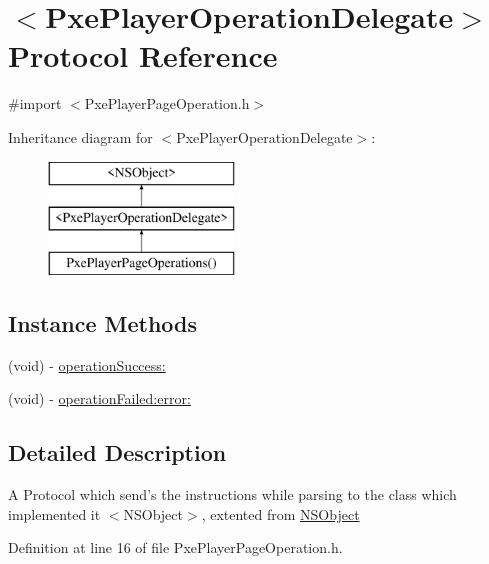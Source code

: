 \hypertarget{protocol_pxe_player_operation_delegate-p}{\section{$<$Pxe\-Player\-Operation\-Delegate$>$ Protocol Reference}
\label{protocol_pxe_player_operation_delegate-p}
}


{\ttfamily \#import $<$Pxe\-Player\-Page\-Operation.\-h$>$}

Inheritance diagram for $<$Pxe\-Player\-Operation\-Delegate$>$\-:\begin{figure}[H]
\begin{center}
\leavevmode
\includegraphics[height=3.000000cm]{protocol_pxe_player_operation_delegate-p}
\end{center}
\end{figure}
\subsection*{Instance Methods}
\begin{DoxyCompactItemize}
\item 
(void) -\/ \hyperlink{protocol_pxe_player_operation_delegate-p_a3b2105606b8df469075d5cfc9931c726}{operation\-Success\-:}
\item 
(void) -\/ \hyperlink{protocol_pxe_player_operation_delegate-p_aa51ed881ea55a516cfc01025a564ccd5}{operation\-Failed\-:error\-:}
\end{DoxyCompactItemize}


\subsection{Detailed Description}
A Protocol which send's the instructions while parsing to the class which implemented it  $<$\-N\-S\-Object$>$, extented from \hyperlink{class_n_s_object-p}{N\-S\-Object} 

Definition at line 16 of file Pxe\-Player\-Page\-Operation.\-h.



